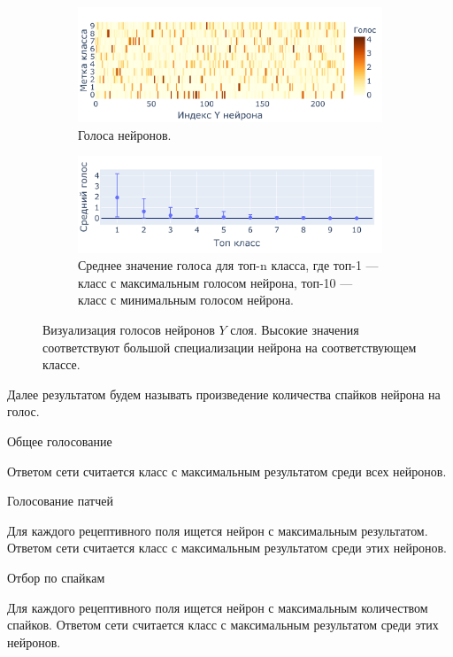 \documentclass[a4paper]{article}
\begin{document}
\begin{figure}[H]
\centering
\begin{subfigure}{0.9\textwidth}
    \includegraphics[width=\textwidth,keepaspectratio=true]{votes_ru.pdf}
    \caption{Голоса нейронов.}
\end{subfigure} 
\begin{subfigure}{0.9\textwidth} 
    \includegraphics[width=\textwidth,keepaspectratio=true]{votes_distribution_ru.pdf}
    \caption{Среднее значение голоса для топ-n класса, где топ-1 --- класс с максимальным голосом нейрона, топ-10 --- класс с минимальным голосом нейрона.}
\end{subfigure}
\caption{Визуализация голосов нейронов $Y$ слоя. Высокие значения соответствуют большой специализации нейрона на соответствующем классе.}
\end{figure}

 Далее результатом будем называть произведение количества спайков нейрона на голос.

\begin{center}
 Общее голосование
\end{center}
Ответом сети считается класс с максимальным результатом среди всех нейронов.

\begin{center}
 Голосование патчей
\end{center}
Для каждого рецептивного поля ищется нейрон с максимальным результатом. Ответом сети считается класс с максимальным результатом среди этих нейронов. 

\begin{center}
 Отбор по спайкам
\end{center}
Для каждого рецептивного поля ищется нейрон с максимальным количеством спайков. Ответом сети считается класс с максимальным результатом среди этих нейронов.
\end{document}
